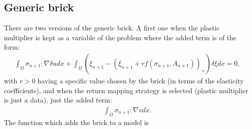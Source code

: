\documentclass[a4paper,11pt,english]{sphinxmanual}
\begin{document}
\subsection{Generic brick}
\label{\detokenize{userdoc/model_plasticity_small_strain:generic-brick}}
There are two versions of the generic brick. A first one when the plastic multiplier is kept as a variable of the problem where the added term is of the form:
\begin{equation*}
\begin{split}\int_{\Omega} \sigma_{n+1} : \nabla \delta u dx +   \int_{\Omega} (\xi_{n+1} - (\xi_{n+1} + r f(\sigma_{n+1}, A_{n+1}))_+) \delta\xi dx = 0,\end{split}
\end{equation*}
with \(r > 0\) having a specific value chosen by the brick (in terms of the elasticity coefficients), and when the return mapping strategy is selected (plastic multiplier is just a data), just the added term:
\begin{equation*}
\begin{split}\int_{\Omega} \sigma_{n+1} : \nabla v dx.\end{split}
\end{equation*}
The function which adds the brick to a model  is

\begin{sphinxVerbatim}[commandchars=\\\{\}]
     
     
        
\end{sphinxVerbatim}
\end{document}
